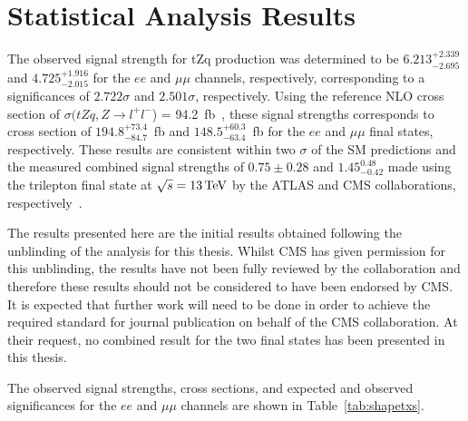 \clearpage
\newpage

\section{Statistical Analysis Results}\label{sec:results}
The observed signal strength for tZq production was determined to be $6.213_{-2.695}^{+2.339}$ and $4.725_{-2.015}^{+1.916}$ for the $ee$ and $\mu\mu$ channels, respectively, corresponding to a significances of $2.722 \sigma$ and $2.501\sigma$, respectively. %
Using the reference NLO cross section of $\sigma (tZq, Z \rightarrow l^{+} l^{-}$) = 94.2~fb~\cite{Campbell:2013yla}, these signal strengths corresponds to cross section of $194.8_{-84.7}^{+73.4}$~fb and $148.5_{-63.4}^{+60.3}$~fb for the $ee$ and $\mu\mu$ final states, respectively. %
These results are consistent within two $\sigma$ of the SM predictions and the measured combined signal strengths of $0.75 \pm 0.28$ and $1.45^{0.48}_{-0.42}$ made using the trilepton final state at $\sqrt{s} = 13 \,\text{Te\hspace{-.08em}V}$ by the ATLAS and CMS collaborations, respectively~\cite{Aaboud:2017ylb,Sirunyan:2017nbr}.


The results presented here are the initial results obtained following the unblinding of the analysis for this thesis.
Whilst CMS has given permission for this unblinding, the results have not been fully reviewed by the collaboration and therefore these results should not be considered to have been endorsed by CMS.
It is expected that further work will need to be done in order to achieve the required standard for journal publication on behalf of the CMS collaboration.
At their request, no combined result for the two final states has been presented in this thesis.

The observed signal strengths, cross sections, and expected and observed significances for the $ee$ and $\mu\mu$ channels are shown in Table~\ref{tab:shapetxs}.

